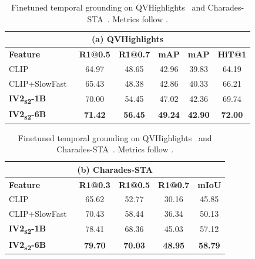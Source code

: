 \begin{enrichment}
\begin{enrichment}
        \begin{table}[H]
            \centering
            \caption{Finetuned temporal grounding on QVHighlights~\cite{lei2021_qvhighlight} and Charades-STA~\cite{gao2017_charadessta}. Metrics follow \cite[Tab.~11]{wang2024_internvideo2}.}
            \label{tab:iv2_grounding_compare}
            \scriptsize
            \setlength{\tabcolsep}{6pt}
            \begin{tabular}{lccccc}
                \hline
                \multicolumn{6}{c}{\textbf{(a) QVHighlights}} \\
                \hline
                \textbf{Feature} & \textbf{R1@0.5} & \textbf{R1@0.7} & \textbf{mAP} & \textbf{mAP} & \textbf{HiT@1} \\
                \hline
                CLIP~\cite{radford2021_clip} & 64.97 & 48.65 & 42.96 & 39.83 & 64.19 \\
                CLIP+SlowFast~\cite{feichtenhofer2019_slowfast} & 65.43 & 48.38 & 42.86 & 40.33 & 66.21 \\
                \textbf{IV2\textsubscript{s2}-1B} & 70.00 & 54.45 & 47.02 & 42.36 & 69.74 \\
                \textbf{IV2\textsubscript{s2}-6B} & \textbf{71.42} & \textbf{56.45} & \textbf{49.24} & \textbf{42.90} & \textbf{72.00} \\
                \hline
            \end{tabular}
            
            \vspace{0.6em}
            
            \setlength{\tabcolsep}{6pt}
            \begin{tabular}{lcccc}
                \hline
                \multicolumn{5}{c}{\textbf{(b) Charades-STA}} \\
                \hline
                \textbf{Feature} & \textbf{R1@0.3} & \textbf{R1@0.5} & \textbf{R1@0.7} & \textbf{mIoU} \\
                \hline
                CLIP~\cite{radford2021_clip} & 65.62 & 52.77 & 30.16 & 45.85 \\
                CLIP+SlowFast~\cite{feichtenhofer2019_slowfast} & 70.43 & 58.44 & 36.34 & 50.13 \\
                \textbf{IV2\textsubscript{s2}-1B} & 78.41 & 68.36 & 45.03 & 57.12 \\
                \textbf{IV2\textsubscript{s2}-6B} & \textbf{79.70} & \textbf{70.03} & \textbf{48.95} & \textbf{58.79} \\
                \hline
            \end{tabular}
        \end{table}
        

\end{enrichment}
\end{enrichment}
